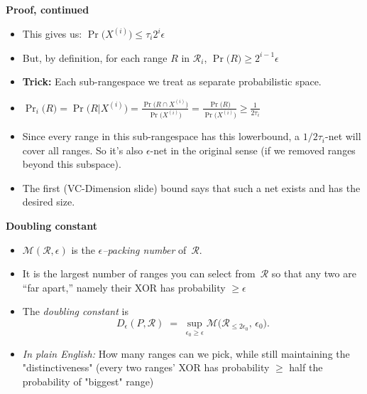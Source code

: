 \documentclass{beamer}
\begin{document}
\begin{frame}{\textbf{Proof, continued}}
\begin{itemize}

\item This gives us: \( \Pr \bigl( X^{(i)}  \bigr) \leq \tau_i 2^i \epsilon \)
\vspace{0.2cm}
\item But, by definition, for each range $R$ in $\mathcal{R}_i$, $\Pr \bigl( R\bigr) \geq 2^{i-1}\epsilon$
\vspace{0.2cm}
\item \textbf{Trick:} Each sub-rangespace we treat as separate probabilistic space. 
\item $\Pr_i \bigl( R \bigr) = \Pr \bigl( R | X^{(i)}\bigr) = \frac{\Pr \bigl(R \cap X^{(i)} \bigr)}{\Pr \bigl(X^{(i)} \bigr)} = \frac{\Pr \bigl(R \bigr)}{\Pr \bigl(X^{(i)} \bigr)} \geq \frac{1}{2\tau_i}$
\item Since every range in this sub-rangespace has this lowerbound, a $1/2\tau_i$-net will cover all ranges. So it's also $\epsilon$-net in the original sense (if we removed ranges beyond this subspace).
\item The first (VC-Dimension slide) bound says that such a net exists and has the desired size. 
\end{itemize}

\end{frame}

\begin{frame}{\textbf{Doubling constant}}
\begin{itemize}
  \item $\displaystyle \mathcal{M}(\mathcal{R},\epsilon)$ is the \emph{$\epsilon$–packing number} of~$\mathcal R$. 
  \vspace{0.5ex}
  \item It is the largest number of ranges you can select from~$\mathcal R$ so that any two are “far apart,” namely
  their XOR has probability $\geq \epsilon$  \vspace{1ex}
  \item The \textit{doubling constant} is
  \[
    D_{\epsilon}(P,\mathcal R)
    \;=\;
    \sup_{\epsilon_0\ge\epsilon}
    \mathcal M\bigl(\mathcal R_{\le2\epsilon_0},\,\epsilon_0\bigr).
  \]
  \vspace{1ex}
  \item \emph{In plain English:}\quad
   How many ranges can we pick, while still maintaining the "distinctiveness" (every two ranges' XOR has probability $\geq$ half the probability of "biggest" range)
\end{itemize}
\end{frame}
\end{document}
